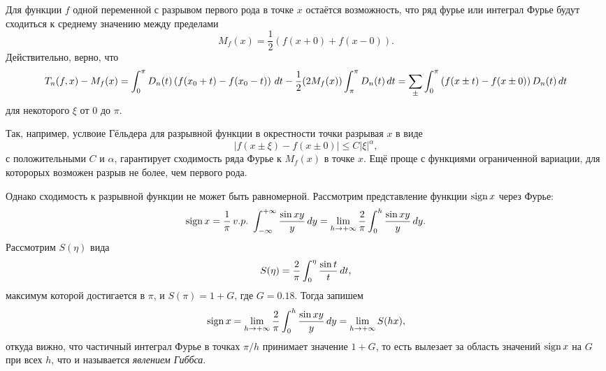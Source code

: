 

Для функции $f$ одной переменной с разрывом первого рода в точке $x$ остаётся возможность, что ряд фурье или интеграл Фурье будут сходиться к среднему значению между пределами
\begin{equation*}
    M_f (x) = \textstyle \frac{1}{2}\left(
        f(x+0) + f(x-0)
    \right).
\end{equation*}
Действительно, верно, что
\begin{equation*}
    T_n (f, x) - M_f (x) = 
    \int_{0}^{\pi} D_n (t) \left(f(x_0 + t) - f(x_0 - t)\right) \, d t
    -
    \frac{1}{2} (2 M_f(x))  \int_{\pi}^{\pi} D_n (t) \, d t
    =
    \sum_{\pm} \int_{0}^{\pi} \left(
        f(x\pm t) - f(x \pm 0)
    \right) D_n (t) \, d t
\end{equation*}
для некоторого $\xi$ от $0$ до $\pi$.

Так, например, услвоие Гёльдера для разрывной функции в окрестности точки разрывая $x$ в виде
\begin{equation*}
    |f(x \pm \xi) - f(x \pm  0)| \leq C |\xi|^\alpha,
\end{equation*}
с положительными $C$ и $\alpha$, гарантирует сходимость ряда Фурье к $M_f (x)$ в точке $x$. Ещё проще с функциями ограниченной вариации, для которорых возможен разрыв не более, чем первого рода. 


Однако сходимость к разрывной функции не может быть равномерной. Рассмотрим представление функции $\mathop{\mathrm{sign}}\nolimits x$ через Фурье:
\begin{equation*}
    \mathop{\mathrm{sign}}\nolimits x = \frac{1}{\pi} \, v.p.\ \int_{-\infty}^{+\infty} \frac{\sin xy}{y} \, d y = \lim_{h \to + \infty} \frac{2}{\pi} \int_{0}^{h}  \frac{\sin xy}{y}\, d y
    .
\end{equation*}
Рассмотрим $S(\eta)$  вида
\begin{equation*}
    S(\eta) = \frac{2}{\pi} \int_{0}^{\eta} \frac{\sin t}{t} \, d t,
\end{equation*}
максимум которой достигается в $\pi$, и $S(\pi) = 1 + G$, где $G = 0.18$. Тогда запишем
\begin{equation*}
    \mathop{\mathrm{sign}}\nolimits x = \lim_{h \to + \infty} \frac{2}{\pi} \int_{0}^{h} \frac{\sin xy}{y}\, d y = \lim_{h \to + \infty} S(hx),
\end{equation*}
откуда вижно, что частичный интеграл Фурье в точках $\pi/h$ принимает значение $1 + G$, то есть вылезает за область значений $\mathop{\mathrm{sign}}\nolimits x$ на $G$ при всех $h$, что и называется \textit{явлением Гиббса}. 




